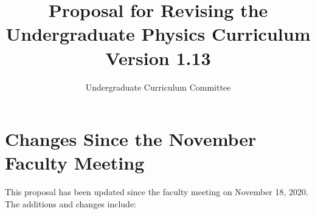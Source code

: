 \documentclass[12pt]{article}
\begin{document}

\title{Proposal for Revising the \\ Undergraduate Physics Curriculum \\ Version 1.13}
\author{Undergraduate Curriculum Committee}

\maketitle

\section{Changes Since the November Faculty Meeting}
This proposal has been updated since the faculty meeting on November
18, 2020.  The additions and changes include:
\end{document}
